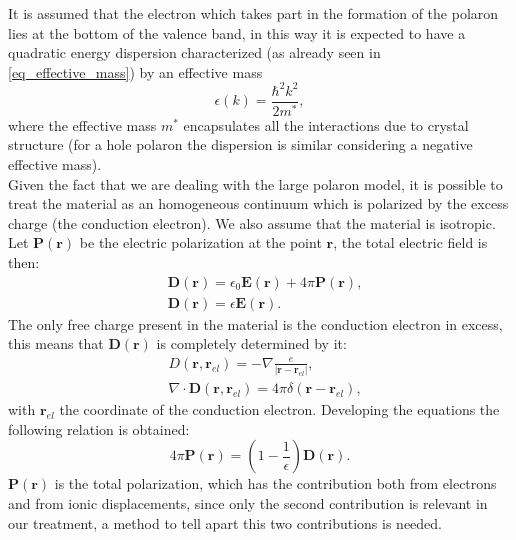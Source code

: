 \documentclass[12pt, a4paper]{report}
\numberwithin{equation}{section}
\begin{document}
It is assumed that the electron which takes part in the formation of the polaron lies at the bottom of the valence band, in this way it is 
expected to have a quadratic energy dispersion characterized (as already seen in \ref{eq_effective_mass}) by an effective mass
\begin{equation}
    \epsilon(k)=\frac{\hbar^2k^2}{2m^*},
\end{equation}
where the effective mass $m^*$ encapsulates all the interactions due to crystal structure (for a hole polaron the dispersion is similar 
considering a negative effective mass).\\
Given the fact that we are dealing with the large polaron model, it is possible to treat the material as an homogeneous continuum 
which is polarized by the excess charge (the conduction electron). We also assume that the material is isotropic.
Let $\mathbf{P}(\mathbf{r})$ be the electric polarization at the point $\mathbf{r}$, the total electric field is then:
\begin{equation}
\begin{split}
    &\mathbf{D}(\mathbf{r})=\epsilon_0\mathbf{E}(\mathbf{r})+4\pi \mathbf{P}(\mathbf{r}),\\
    &\mathbf{D}(\mathbf{r})=\epsilon \mathbf{E}(\mathbf{r}).
\end{split}
\end{equation} 
The only free charge present in the material is the conduction electron in excess, this means that $\mathbf{D}(\mathbf{r})$ is completely determined by it:
\begin{equation}
\begin{split}
    &D(\mathbf{r},\mathbf{r}_{el})=-\nabla\frac{e}{|\mathbf{r}-\mathbf{r}_{el}|}, \\
    &\nabla\cdot \mathbf{D}(\mathbf{r},\mathbf{r}_{el})=4\pi\delta(\mathbf{r}-\mathbf{r}_{el}),
\end{split}
\end{equation}
with $\mathbf{r}_{el}$ the coordinate of the conduction electron. Developing the equations the following relation is obtained:
\begin{equation}
    4\pi \mathbf{P}(\mathbf{r}) = \left(1-\frac{1}{\epsilon}\right)\mathbf{D}(\mathbf{r}).
\end{equation}
$\mathbf{P}(\mathbf{r})$ is the total polarization, which has the contribution both from electrons and from ionic displacements, since only the second 
contribution is relevant in our treatment, a method to tell apart this two contributions is needed.\\
\end{document}
